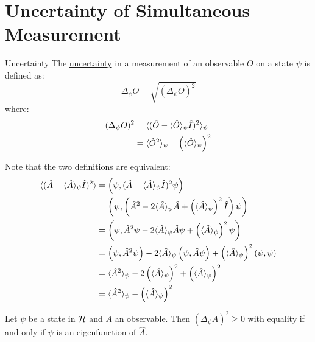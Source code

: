 \documentclass[../Main.tex]{subfiles}
\begin{document}
\section{Uncertainty of Simultaneous Measurement}
\begin{definition}{Uncertainty}
    The \underline{uncertainty} in a measurement of an observable $O$ on a state $\psi$ is defined as:
    \begin{equation*}
        \Delta_\psi O = \sqrt{(\Delta_\psi O)^2}
    \end{equation*}
    where:
    \begin{align*}
        (\Delta_\psi O)^2 &= \langle (\hat{O} - \langle \hat{O} \rangle_\psi \hat{I})^2 \rangle_\psi \\
        &= \langle \hat{O}^2 \rangle_\psi - \left(\langle \hat{O} \rangle_\psi\right)^2
    \end{align*}
\end{definition}
Note that the two definitions are equivalent:
\begin{align*}
    \langle (\hat{A} - \langle \hat{A} \rangle_\psi \hat{I})^2 \rangle&= \left(\psi,(\hat{A} - \langle \hat{A} \rangle_\psi \hat{I})^2\psi\right) \\
    &= \left(\psi,\left(\hat{A}^2 - 2\langle \hat{A} \rangle_\psi \hat{A} + \left(\langle \hat{A} \rangle_\psi\right)^2\hat{I}\right)\psi\right) \\
    &= \left(\psi,\hat{A}^2 \psi - 2\langle \hat{A} \rangle_\psi \hat{A}\psi + \left(\langle \hat{A} \rangle_\psi\right)^2\psi\right) \\
    &= \left(\psi,\hat{A}^2 \psi\right) - 2\langle \hat{A} \rangle_\psi \left(\psi,\hat{A}\psi\right) + \left(\langle \hat{A} \rangle_\psi\right)^2\left(\psi,\psi\right) \\
    &= \langle \hat{A}^2 \rangle_\psi - 2\left(\langle \hat{A} \rangle_\psi\right)^2 + \left(\langle \hat{A} \rangle_\psi\right)^2 \\
    &= \langle \hat{A}^2 \rangle_\psi - \left(\langle \hat{A} \rangle_\psi\right)^2
\end{align*}
\begin{lemma}
    Let $\psi$ be a state in $\mathcal{H}$ and $A$ an observable. Then $(\Delta_{\psi} A)^2 \geq 0$ with equality if and only if $\psi$ is an eigenfunction of $\hat{A}$.
    \label{lemUncProps}
\end{lemma}
\end{document}
